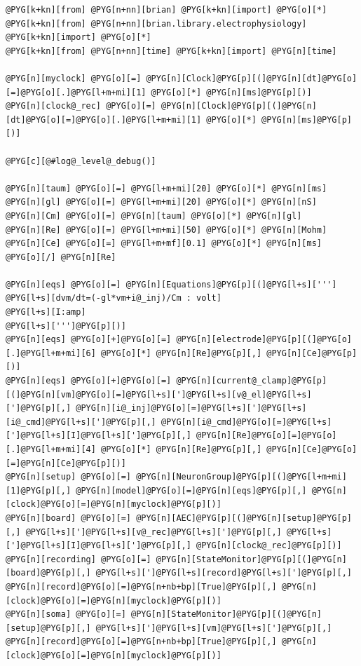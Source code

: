 \documentclass[letterpaper,10pt,english]{manual}
\begin{document}
\begin{Verbatim}[commandchars=@\[\]]
@PYG[k+kn][from] @PYG[n+nn][brian] @PYG[k+kn][import] @PYG[o][*]
@PYG[k+kn][from] @PYG[n+nn][brian.library.electrophysiology] @PYG[k+kn][import] @PYG[o][*]
@PYG[k+kn][from] @PYG[n+nn][time] @PYG[k+kn][import] @PYG[n][time]

@PYG[n][myclock] @PYG[o][=] @PYG[n][Clock]@PYG[p][(]@PYG[n][dt]@PYG[o][=]@PYG[o][.]@PYG[l+m+mi][1] @PYG[o][*] @PYG[n][ms]@PYG[p][)]
@PYG[n][clock@_rec] @PYG[o][=] @PYG[n][Clock]@PYG[p][(]@PYG[n][dt]@PYG[o][=]@PYG[o][.]@PYG[l+m+mi][1] @PYG[o][*] @PYG[n][ms]@PYG[p][)]

@PYG[c][@#log@_level@_debug()]

@PYG[n][taum] @PYG[o][=] @PYG[l+m+mi][20] @PYG[o][*] @PYG[n][ms]
@PYG[n][gl] @PYG[o][=] @PYG[l+m+mi][20] @PYG[o][*] @PYG[n][nS]
@PYG[n][Cm] @PYG[o][=] @PYG[n][taum] @PYG[o][*] @PYG[n][gl]
@PYG[n][Re] @PYG[o][=] @PYG[l+m+mi][50] @PYG[o][*] @PYG[n][Mohm]
@PYG[n][Ce] @PYG[o][=] @PYG[l+m+mf][0.1] @PYG[o][*] @PYG[n][ms] @PYG[o][/] @PYG[n][Re]

@PYG[n][eqs] @PYG[o][=] @PYG[n][Equations]@PYG[p][(]@PYG[l+s][''']
@PYG[l+s][dvm/dt=(-gl*vm+i@_inj)/Cm : volt]
@PYG[l+s][I:amp]
@PYG[l+s][''']@PYG[p][)]
@PYG[n][eqs] @PYG[o][+]@PYG[o][=] @PYG[n][electrode]@PYG[p][(]@PYG[o][.]@PYG[l+m+mi][6] @PYG[o][*] @PYG[n][Re]@PYG[p][,] @PYG[n][Ce]@PYG[p][)]
@PYG[n][eqs] @PYG[o][+]@PYG[o][=] @PYG[n][current@_clamp]@PYG[p][(]@PYG[n][vm]@PYG[o][=]@PYG[l+s][']@PYG[l+s][v@_el]@PYG[l+s][']@PYG[p][,] @PYG[n][i@_inj]@PYG[o][=]@PYG[l+s][']@PYG[l+s][i@_cmd]@PYG[l+s][']@PYG[p][,] @PYG[n][i@_cmd]@PYG[o][=]@PYG[l+s][']@PYG[l+s][I]@PYG[l+s][']@PYG[p][,] @PYG[n][Re]@PYG[o][=]@PYG[o][.]@PYG[l+m+mi][4] @PYG[o][*] @PYG[n][Re]@PYG[p][,] @PYG[n][Ce]@PYG[o][=]@PYG[n][Ce]@PYG[p][)]
@PYG[n][setup] @PYG[o][=] @PYG[n][NeuronGroup]@PYG[p][(]@PYG[l+m+mi][1]@PYG[p][,] @PYG[n][model]@PYG[o][=]@PYG[n][eqs]@PYG[p][,] @PYG[n][clock]@PYG[o][=]@PYG[n][myclock]@PYG[p][)]
@PYG[n][board] @PYG[o][=] @PYG[n][AEC]@PYG[p][(]@PYG[n][setup]@PYG[p][,] @PYG[l+s][']@PYG[l+s][v@_rec]@PYG[l+s][']@PYG[p][,] @PYG[l+s][']@PYG[l+s][I]@PYG[l+s][']@PYG[p][,] @PYG[n][clock@_rec]@PYG[p][)]
@PYG[n][recording] @PYG[o][=] @PYG[n][StateMonitor]@PYG[p][(]@PYG[n][board]@PYG[p][,] @PYG[l+s][']@PYG[l+s][record]@PYG[l+s][']@PYG[p][,] @PYG[n][record]@PYG[o][=]@PYG[n+nb+bp][True]@PYG[p][,] @PYG[n][clock]@PYG[o][=]@PYG[n][myclock]@PYG[p][)]
@PYG[n][soma] @PYG[o][=] @PYG[n][StateMonitor]@PYG[p][(]@PYG[n][setup]@PYG[p][,] @PYG[l+s][']@PYG[l+s][vm]@PYG[l+s][']@PYG[p][,] @PYG[n][record]@PYG[o][=]@PYG[n+nb+bp][True]@PYG[p][,] @PYG[n][clock]@PYG[o][=]@PYG[n][myclock]@PYG[p][)]


\end{Verbatim}
\end{document}
